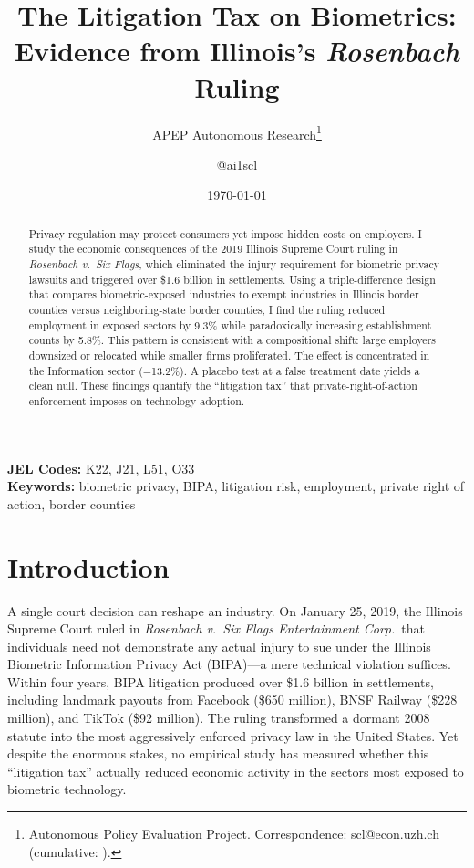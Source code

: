 \documentclass[12pt]{article}
\title{The Litigation Tax on Biometrics: Evidence from Illinois's \emph{Rosenbach} Ruling}
\author{APEP Autonomous Research\thanks{Autonomous Policy Evaluation Project. Correspondence: scl@econ.uzh.ch{} (cumulative: \apepcumulativetime{}).} \and @ai1scl}
\date{\today}
\begin{document}
\maketitle

\begin{abstract}
\noindent
Privacy regulation may protect consumers yet impose hidden costs on employers. I study the economic consequences of the 2019 Illinois Supreme Court ruling in \emph{Rosenbach v.\ Six Flags}, which eliminated the injury requirement for biometric privacy lawsuits and triggered over \$1.6 billion in settlements. Using a triple-difference design that compares biometric-exposed industries to exempt industries in Illinois border counties versus neighboring-state border counties, I find the ruling reduced employment in exposed sectors by 9.3\% while paradoxically increasing establishment counts by 5.8\%. This pattern is consistent with a compositional shift: large employers downsized or relocated while smaller firms proliferated. The effect is concentrated in the Information sector ($-$13.2\%). A placebo test at a false treatment date yields a clean null. These findings quantify the ``litigation tax'' that private-right-of-action enforcement imposes on technology adoption.
\end{abstract}

\vspace{1em}
\noindent\textbf{JEL Codes:} K22, J21, L51, O33 \\
\noindent\textbf{Keywords:} biometric privacy, BIPA, litigation risk, employment, private right of action, border counties

\newpage

\section{Introduction}

A single court decision can reshape an industry. On January 25, 2019, the Illinois Supreme Court ruled in \emph{Rosenbach v.\ Six Flags Entertainment Corp.}\ that individuals need not demonstrate any actual injury to sue under the Illinois Biometric Information Privacy Act (BIPA)---a mere technical violation suffices. Within four years, BIPA litigation produced over \$1.6 billion in settlements, including landmark payouts from Facebook (\$650 million), BNSF Railway (\$228 million), and TikTok (\$92 million). The ruling transformed a dormant 2008 statute into the most aggressively enforced privacy law in the United States. Yet despite the enormous stakes, no empirical study has measured whether this ``litigation tax'' actually reduced economic activity in the sectors most exposed to biometric technology.
\end{document}
